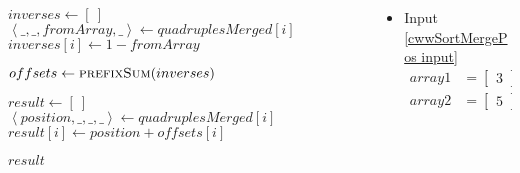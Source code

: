 \begin{frame}[containsverbatim]{\cwwalgortihmexampleframe}
\begin{columns}[c]
\begin{column}{0.35\textwidth}
{\begin{minipage}[c]{\textwidth}
\begin{algorithm}[H]
\begin{algorithmic}[1]
                                            \State $inverses \gets \left[\ \right]$
                                                \State $\left<\_, \_, fromArray, \_\right> \gets quadruplesMerged{\left[i\right]}$
                                                \State $inverses{\left[i\right]} \gets 1 - fromArray$
                                            \EndFor
                                            \label{cwwSortMergePos after inverses}

                                            \label{cwwSortMergePos before offsets}
                                            \State $offsets \gets \Call{prefixSum}{inverses}$
                                            \label{cwwSortMergePos after offsets}
            
                                            \State $result \gets \left[\ \right]$
                                                \State $\left<position, \_, \_, \_\right> \gets quadruplesMerged{\left[i\right]}$
                                                \State $result{\left[i\right]} \gets position + offsets{\left[i\right]}$
                                            \EndFor                             
                                            \label{cwwSortMergePos after result}
                
                                            \State \Return $result$
                                        \EndFunction
                                    \end{algorithmic}
                                \end{algorithm}
                            \endgroup
                        \end{minipage}
                    }
                \end{column}

                \begin{column}{0.65\textwidth}
                    \vspace{-0.2cm}
                    \tiny
                    \begin{multicols}{2}
                        \begin{itemize}
                            \item Input \cref{cwwSortMergePos input}
                            \begin{align*}
                                array1 & = \begin{bmatrix}3\end{bmatrix} \\
                                array2 & = \begin{bmatrix}5\end{bmatrix}
                            \end{align*}


\end{itemize}
\end{multicols}
\end{column}
\end{columns}
\end{frame}

